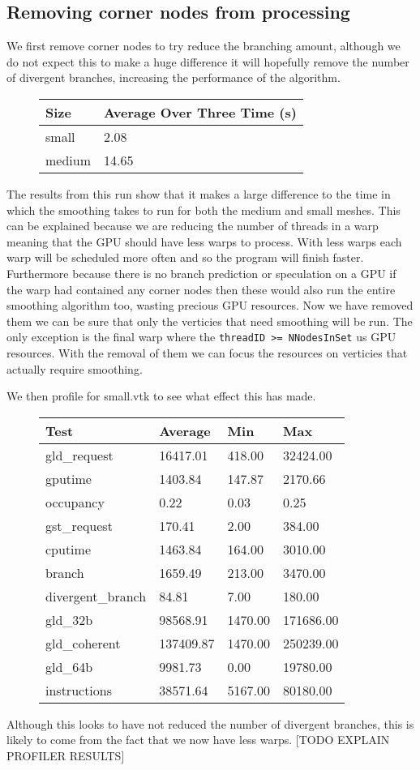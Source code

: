\subsection*{Removing corner nodes from processing}
We first remove corner nodes to try reduce the branching amount, although we do not expect this to make a huge difference it will hopefully remove the number of divergent branches, increasing the performance of the algorithm. \\
\begin{figure}[H]\centering \begin{tabular}{ l | l }
  \hline
  Size & Average Over Three Time (s)\\
  \hline
  \hline
  small & 2.08 \\
  medium & 14.65 \\
  \hline
\end{tabular} \end{figure}

The results from this run show that it makes a large difference to the time in which the smoothing takes to run for both the medium and small meshes. This can be explained because we are reducing the number of threads in a warp meaning that the GPU should have less warps to process. With less warps each warp will be scheduled more often and so the program will finish faster. Furthermore because there is no branch prediction or speculation on a GPU if the warp had contained any corner nodes then these would also run the entire smoothing algorithm too, wasting precious GPU resources. Now we have removed them we can be sure that only the verticies that need smoothing will be run.
The only exception is the final warp where the \verb!threadID >= NNodesInSet!
us GPU resources.
With the removal of them we can focus the resources on verticies that actually require smoothing.

We then profile for small.vtk to see what effect this has made.\\
\begin{figure}[H]\centering \begin{tabular}{ l | l | l | l}
\hline
Test & Average & Min & Max \\
\hline
\hline
gld\_request & 16417.01 & 418.00 & 32424.00 \\
gputime & 1403.84 & 147.87 & 2170.66 \\
occupancy & 0.22 & 0.03 & 0.25 \\
gst\_request & 170.41 & 2.00 & 384.00 \\
cputime & 1463.84 & 164.00 & 3010.00 \\
branch & 1659.49 & 213.00 & 3470.00 \\
divergent\_branch & 84.81 & 7.00 & 180.00 \\
gld\_32b & 98568.91 & 1470.00 & 171686.00 \\
gld\_coherent & 137409.87 & 1470.00 & 250239.00 \\
gld\_64b & 9981.73 & 0.00 & 19780.00 \\
instructions & 38571.64 & 5167.00 & 80180.00 \\
\hline
\end{tabular} \end{figure}

Although this looks to have not reduced the number of divergent branches, this is likely to come from the fact that we now have less warps. [TODO EXPLAIN PROFILER RESULTS]